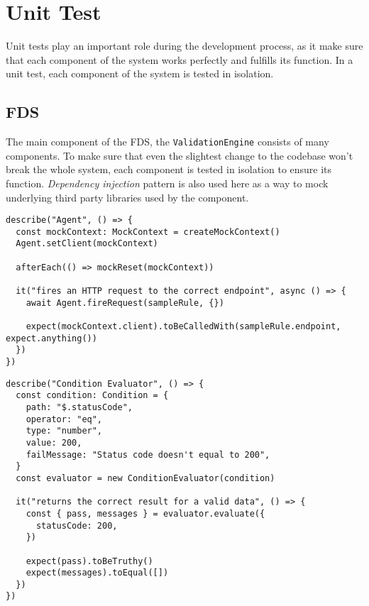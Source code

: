 \section{Unit Test}

  Unit tests play an important role during the development process, as it make sure that each component of the system works perfectly and fulfills its function. In a unit test, each component of the system is tested in isolation.

  \subsection{FDS}

    The main component of the FDS, the \verb;ValidationEngine; consists of many components. To make sure that even the slightest change to the codebase won't break the whole system, each component is tested in isolation to ensure its function. \emph{Dependency injection} pattern is also used here as a way to mock underlying third party libraries used by the component. 

    \begin{lstlisting}[style=es6, caption={Dependency injection usage in a unit test within FDS project (TypeScript)}]
describe("Agent", () => {
  const mockContext: MockContext = createMockContext()
  Agent.setClient(mockContext)

  afterEach(() => mockReset(mockContext))

  it("fires an HTTP request to the correct endpoint", async () => {
    await Agent.fireRequest(sampleRule, {})

    expect(mockContext.client).toBeCalledWith(sampleRule.endpoint, expect.anything())
  })
})
    \end{lstlisting}

    \begin{lstlisting}[style=es6, caption={Example unit test of the condition evaluator (TypeScript)}]
describe("Condition Evaluator", () => {
  const condition: Condition = {
    path: "$.statusCode",
    operator: "eq",
    type: "number",
    value: 200,
    failMessage: "Status code doesn't equal to 200",
  }
  const evaluator = new ConditionEvaluator(condition)

  it("returns the correct result for a valid data", () => {
    const { pass, messages } = evaluator.evaluate({
      statusCode: 200,
    })

    expect(pass).toBeTruthy()
    expect(messages).toEqual([])
  })
})
    \end{lstlisting}

